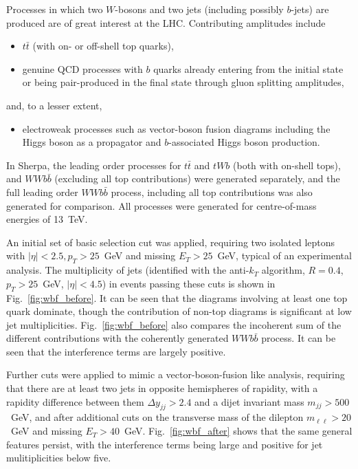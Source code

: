 \documentclass[11pt]{cernrep}
\begin{document}
Processes in which two $W$-bosons and two jets (including possibly $b$-jets) are produced are of great interest
at the LHC.  Contributing amplitudes include
\begin{itemize}
\item $t\bar{t}$ (with on- or off-shell top quarks),
\item genuine QCD processes with $b$ quarks already entering from the initial state or being
  pair-produced in the final state through gluon splitting amplitudes, 
\end{itemize}
and, to a lesser extent,
\begin{itemize}
\item electroweak processes such as vector-boson fusion diagrams including the Higgs boson
  as a propagator and $b$-associated Higgs boson production.
\end{itemize}
In Sherpa, the leading order processes for $t\bar{t}$ and $tWb$ (both with on-shell tops), and $WWb\bar{b}$
(excluding all top contributions) were generated separately, and the full leading order $WWb\bar{b}$ process,
including all top contributions was also generated for comparison. All processes were generated for centre-of-mass
energies of 13~TeV. 

An initial set of basic selection cut was applied, requiring two isolated leptons with $|\eta| < 2.5, p_T > 25$~GeV and
missing $E_T > 25$~GeV, typical of an experimental analysis. The multiplicity of jets (identified with the anti-$k_T$
algorithm, $R=0.4$, $p_T > 25$~GeV, $|\eta| < 4.5$) in events passing these cuts is shown in Fig.~\ref{fig:wbf_before}.
It can be seen that the diagrams involving at least one top quark dominate, though the contribution of non-top diagrams
is significant at low jet multiplicities.  Fig.~\ref{fig:wbf_before} also compares the incoherent sum of the different
contributions with the coherently generated $WWb\bar{b}$ process. It can be seen that the interference terms are largely
positive.

Further cuts were applied to mimic a vector-boson-fusion like analysis, requiring that there are at least two jets in
opposite hemispheres of rapidity, with a rapidity difference between them
$\Delta y_{jj} > 2.4$ and a dijet invariant
mass $m_{jj}>500$~GeV, and after additional cuts on the transverse mass
of the dilepton $m_{\ell\ell} > 20$~GeV and missing $E_T > 40$~GeV.
Fig.~\ref{fig:wbf_after} shows that the same general features persist, with the interference terms being large and
positive for jet mulitiplicities below five.
\end{document}

